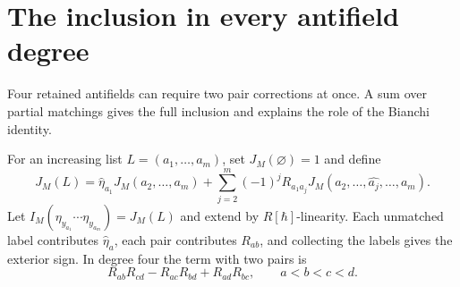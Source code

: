 \section{The inclusion in every antifield degree}
\label{cbc:cf:matching-section}

Four retained antifields can require two pair corrections at once.
A sum over partial matchings gives the full inclusion and explains
the role of the Bianchi identity.

For an increasing list $L=(a_1,\ldots,a_m)$, set
$J_M(\varnothing)=1$ and define
\begin{equation}\label{cbc:cf:matching}
 J_M(L)=\widehat\eta_{a_1}J_M(a_2,\ldots,a_m)
 +\sum_{j=2}^m(-1)^jR_{a_1a_j}
             J_M(a_2,\ldots,\widehat{a_j},\ldots,a_m).
\end{equation}
Let $I_M(\eta_{y_{a_1}}\cdots\eta_{y_{a_m}})=J_M(L)$
and extend by $R[\hbar]$-linearity. Each unmatched label
contributes $\widehat\eta_a$, each pair contributes $R_{ab}$,
and collecting the labels gives the exterior sign. In degree
four the term with two pairs is
\[
 R_{ab}R_{cd}-R_{ac}R_{bd}+R_{ad}R_{bc},
 \qquad a<b<c<d.
\]

